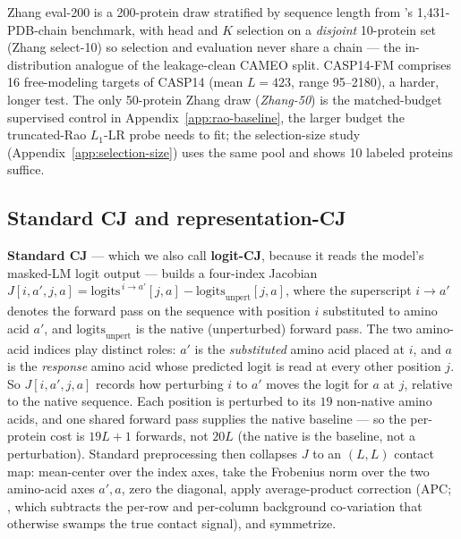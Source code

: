 \documentclass{article}
\begin{document}
Zhang eval-200 is a 200-protein draw stratified by sequence length from
\citeauthor{zhang2024cj}'s 1{,}431-PDB-chain benchmark, with head and $K$
selection on a \emph{disjoint} 10-protein set (Zhang select-10) so
selection and evaluation never share a chain --- the in-distribution
analogue of the leakage-clean CAMEO split. CASP14-FM comprises 16
free-modeling targets of CASP14 \citep{kryshtafovych2021casp14} (mean
$L{=}423$, range 95--2180), a harder, longer test. The only 50-protein
Zhang draw (\emph{Zhang-50}) is the matched-budget supervised control in
Appendix~\ref{app:rao-baseline}, the larger budget the truncated-Rao
$L_1$-LR probe needs to fit; the selection-size study
(Appendix~\ref{app:selection-size}) uses the same pool and shows 10
labeled proteins suffice.

\subsection{Standard CJ and representation-CJ}
\label{sec:repr-cj-method}

\textbf{Standard CJ} \citep{zhang2024cj} --- which we also call
\textbf{logit-CJ}, because it reads the model's masked-LM logit output
--- builds a four-index Jacobian
$J[i, a', j, a] = \mathrm{logits}^{\,i\to a'}[j, a] - \mathrm{logits}_{\mathrm{unpert}}[j, a]$,
where the superscript $i\to a'$ denotes the forward pass on the sequence
with position $i$ substituted to amino acid $a'$, and
$\mathrm{logits}_{\mathrm{unpert}}$ is the native (unperturbed) forward
pass. The two amino-acid indices play distinct roles: $a'$ is the
\emph{substituted} amino acid placed at $i$, and $a$ is the
\emph{response} amino acid whose predicted logit is read at every other
position $j$. So $J[i,a',j,a]$ records how perturbing $i$ to $a'$ moves
the logit for $a$ at $j$, relative to the native sequence. Each position
is perturbed to its $19$ non-native amino acids, and one shared forward
pass supplies the native baseline --- so the per-protein cost is
$19L + 1$ forwards, not $20L$ (the native is the baseline, not a
perturbation). Standard preprocessing then collapses $J$ to an $(L, L)$
contact map: mean-center over the index axes, take the Frobenius norm
over the two amino-acid axes $a', a$, zero the diagonal,
apply average-product correction (APC; \citealp{dunn2008apc}, which
subtracts the per-row and per-column background co-variation that
otherwise swamps the true contact signal), and symmetrize.
\end{document}
